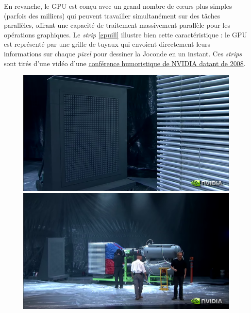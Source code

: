 En revanche, le GPU est conçu avec un grand nombre de cœurs plus simples (parfois des milliers) qui peuvent travailler simultanément sur des tâches parallèles, offrant une capacité de traitement massivement parallèle pour les opérations graphiques. Le \textit{strip} \ref{gpuill} illustre bien cette caractéristique : le GPU est représenté par une grille de tuyaux qui envoient directement leurs informations sur chaque \textit{pixel} pour dessiner la Joconde en un instant. Ces \textit{strips} sont tirés d'une vidéo d'une \href{https://www.youtube.com/watch?app=desktop&v=WmW6SD-EHVY}{conférence humoristique de NVIDIA datant de 2008}.

\begin{figure}[h]
  \begin{minipage}[b]{0.30\linewidth}
    \centering
    \includegraphics[width=\linewidth]{images/pipeline/gpu03.png}
  \end{minipage}
  \hfill
  \begin{minipage}[b]{0.30\linewidth}
    \centering
    \includegraphics[width=\linewidth]{images/pipeline/gpu04.png}
  \end{minipage}

\end{figure}
